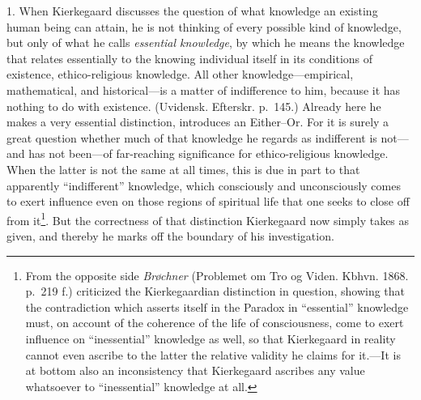 \documentclass[12pt,a4paper]{book}
\newcommand{\opage}[1]{\marginnote{\footnotesize\textit{[#1]}}}
\begin{document}
1. When Kierkegaard discusses the question of what knowledge an existing
human being can attain, he is not thinking of every possible kind of
knowledge, but only of what he calls \textit{essential knowledge}, by
which he means the knowledge that relates essentially to the knowing
individual itself in its conditions of existence, ethico-religious
knowledge. All other knowledge---empirical, mathematical, and
historical---is a matter of indifference to him, because it has nothing
to do with existence. (Uvidensk. Efterskr. p.~145.) Already here he
makes a very essential distinction, introduces an Either--Or. For it is
surely a great question whether much of that knowledge he regards as
indifferent is not---and has not been---of far-reaching significance for
ethico-religious knowledge. When the latter is not the same at all times,
this is due in part to that apparently ``indifferent'' knowledge, which
consciously and unconsciously comes to exert influence even on those
regions of
\opage{59}spiritual life that one seeks to close off from it\footnote{From
the opposite side \textit{Brøchner} (Problemet om Tro og Viden. Kbhvn.
1868. p.~219 f.) criticized the Kierkegaardian distinction in question,
showing that the contradiction which asserts itself in the Paradox in
``essential'' knowledge must, on account of the coherence of the life of
consciousness, come to exert influence on ``inessential'' knowledge as
well, so that Kierkegaard in reality cannot even ascribe to the latter
the relative validity he claims for it.---It is at bottom also an
inconsistency that Kierkegaard ascribes any value whatsoever to
``inessential'' knowledge at all.}. But the correctness of that
distinction Kierkegaard now simply takes as given, and thereby he marks
off the boundary of his investigation.
\end{document}
